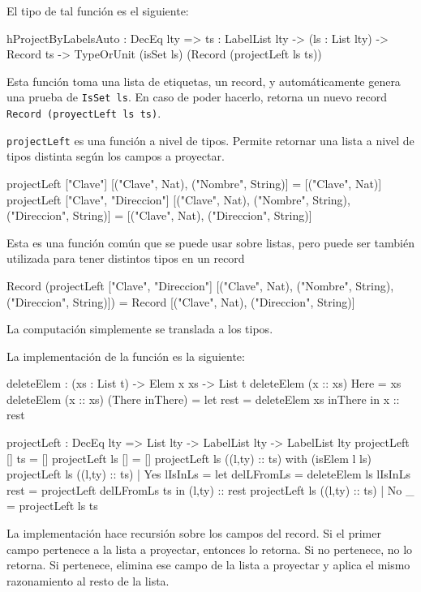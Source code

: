El tipo de tal función es el siguiente:

\begin{code}
hProjectByLabelsAuto : DecEq lty => {ts : LabelList lty} -> 
  (ls : List lty) -> Record ts -> 
  TypeOrUnit (isSet ls) (Record (projectLeft ls ts))
\end{code}

Esta función toma una lista de etiquetas, un record, y automáticamente genera una prueba de \texttt{IsSet ls}. En caso de poder hacerlo, retorna un nuevo record \texttt{Record (proyectLeft ls ts)}.

\texttt{projectLeft} es una función a nivel de tipos. Permite retornar una lista a nivel de tipos distinta según los campos a proyectar.

\begin{code}
projectLeft ["Clave"] 
 [("Clave", Nat), ("Nombre", String)] =
 [("Clave", Nat)]
projectLeft ["Clave", "Direccion"] 
 [("Clave", Nat), ("Nombre", String), ("Direccion", String)] =
 [("Clave", Nat), ("Direccion", String)]
\end{code}

Esta es una función común que se puede usar sobre listas, pero puede ser también utilizada para tener distintos tipos en un record

\begin{code}
Record (projectLeft ["Clave", "Direccion"] 
 [("Clave", Nat), ("Nombre", String), ("Direccion", String)]) =
Record [("Clave", Nat), ("Direccion", String)]
\end{code}

La computación simplemente se translada a los tipos.

La implementación de la función es la siguiente:

\begin{code}
deleteElem : (xs : List t) -> Elem x xs -> List t
deleteElem (x :: xs) Here = xs
deleteElem (x :: xs) (There inThere) =
  let rest = deleteElem xs inThere
  in x :: rest  

projectLeft : DecEq lty => List lty -> LabelList lty -> 
  LabelList lty
projectLeft [] ts = []
projectLeft ls [] = []
projectLeft ls ((l,ty) :: ts) with (isElem l ls)
  projectLeft ls ((l,ty) :: ts) | Yes lIsInLs = 
    let delLFromLs = deleteElem ls lIsInLs
        rest = projectLeft delLFromLs ts
    in (l,ty) :: rest
  projectLeft ls ((l,ty) :: ts) | No _ = projectLeft ls ts
\end{code}

La implementación hace recursión sobre los campos del record. Si el primer campo pertenece a la lista a proyectar, entonces lo retorna. Si no pertenece, no lo retorna. Si pertenece, elimina ese campo de la lista a proyectar y aplica el mismo razonamiento al resto de la lista.

